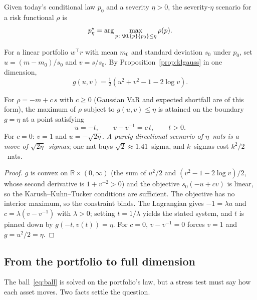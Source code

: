 \begin{definition}
Given today's conditional law $p_0$ and a severity $\eta>0$, the severity-$\eta$
scenario for a risk functional $\rho$ is
\begin{equation}
\label{eq:ball}
p^\star_\eta=\arg\max_{p\,:\,\KL{p}{p_0}\le\eta}\rho(p).
\end{equation}
\end{definition}

For a linear portfolio $w^\top r$ with mean $m_0$ and standard deviation $s_0$
under $p_0$, set $u=(m-m_0)/s_0$ and $v=s/s_0$. By
Proposition~\ref{prop:klgauss} in one dimension,
\begin{equation}
\label{eq:g}
g(u,v)=\tfrac12\left(u^2+v^2-1-2\log v\right).
\end{equation}

\begin{proposition}
\label{prop:ballsol}
For $\rho=-m+c\,s$ with $c\ge0$ (Gaussian VaR and expected shortfall are of this
form), the maximum of $\rho$ subject to $g(u,v)\le\eta$ is attained on the
boundary $g=\eta$ at a point satisfying
\begin{equation*}
u=-t,\qquad v-v^{-1}=c\,t,\qquad t>0 .
\end{equation*}
For $c=0$: $v=1$ and $u=-\sqrt{2\eta}$. \emph{A purely directional scenario of
$\eta$~nats is a move of $\sqrt{2\eta}$~sigmas}; one nat buys
$\sqrt2\approx1.41$~sigma, and $k$~sigmas cost $k^2/2$~nats.
\end{proposition}

\begin{proof}
$g$ is convex on $\mathbb R\times(0,\infty)$ (the sum of $u^2/2$ and
$(v^2-1-2\log v)/2$, whose second derivative is $1+v^{-2}>0$) and the objective
$s_0(-u+cv)$ is linear, so the Karush--Kuhn--Tucker conditions are sufficient.
The objective has no interior maximum, so the constraint binds. The Lagrangian
gives $-1=\lambda u$ and $c=\lambda(v-v^{-1})$ with $\lambda>0$; setting
$t=1/\lambda$ yields the stated system, and $t$ is pinned down by
$g(-t,v(t))=\eta$. For $c=0$, $v-v^{-1}=0$ forces $v=1$ and $g=u^2/2=\eta$.
\end{proof}

\subsection{From the portfolio to full dimension}

The ball~\eqref{eq:ball} is solved on the portfolio's law, but a stress test must
say how each asset moves. Two facts settle the question.

